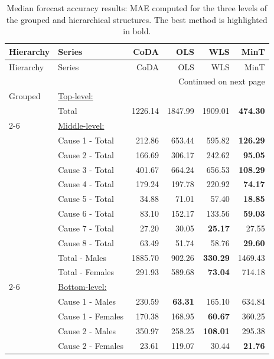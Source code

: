 \begin{center}
\tabcolsep 0.315in
\renewcommand\arraystretch{0.98}
\begin{small}
\begin{longtable}{@{}llrrrr@{}}
\caption{\small Median forecast accuracy results: MAE computed for the three levels of the grouped and hierarchical structures. The best method is highlighted in bold.}\label{tab:mae_median} \\
\toprule
Hierarchy & Series & CoDA & OLS & WLS & MinT \\
\midrule
\endfirsthead
\toprule
Hierarchy & Series & CoDA & OLS & WLS & MinT \\
\midrule
\endhead
\hline \multicolumn{6}{r}{{Continued on next page}} \\
\endfoot
\endlastfoot
Grouped & \multicolumn{5}{l}{\underline{Top-level:}}\\
& Total & 1226.14 & 1847.99 & 1909.01 & \textbf{474.30} \\
\cmidrule{2-6}
& \multicolumn{5}{l}{\underline{Middle-level:}}\\
& Cause 1 - Total & 212.86 & 653.44 & 595.82 & \textbf{126.29} \\
& Cause 2 - Total & 166.69 & 306.17 & 242.62 & \textbf{95.05} \\
& Cause 3 - Total & 401.67 & 664.24 & 656.53 & \textbf{108.29} \\
& Cause 4 - Total & 179.24 & 197.78 & 220.92 & \textbf{74.17} \\
& Cause 5 - Total & 34.88 & 71.01 & 57.40 & \textbf{18.85} \\
& Cause 6 - Total & 83.10 & 152.17 & 133.56 & \textbf{59.03} \\
& Cause 7 - Total & 27.20 & 30.05 & \textbf{25.17} & 27.55 \\
& Cause 8 - Total & 63.49 & 51.74 & 58.76 & \textbf{29.60} \\
& Total - Males & 1885.70 & 902.26 & \textbf{330.29} & 1469.43 \\
& Total - Females & 291.93 & 589.68 & \textbf{73.04} & 714.18 \\
\cmidrule{2-6}
& \multicolumn{5}{l}{\underline{Bottom-level:}}\\
& Cause 1 - Males & 230.59 & \textbf{63.31} & 165.10 & 634.84 \\
& Cause 1 - Females & 170.38 & 168.95 & \textbf{60.67} & 360.25 \\
& Cause 2 - Males & 350.97 & 258.25 & \textbf{108.01} & 295.38 \\
& Cause 2 - Females & 23.61 & 119.07 & 30.44 & \textbf{21.76} \\

\end{longtable}
\end{small}
\end{center}
